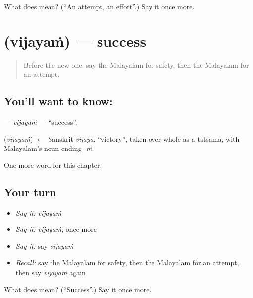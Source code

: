 \begin{tcolorbox}[breakable,colback=teal!4,colframe=teal!35!black,title={Before you move on}]
What does  mean? (\textquotedblleft{}An attempt, an effort\textquotedblright{}.) Say it once more.
\end{tcolorbox}
\section[\texorpdfstring{\ml{വിജയം} (vijayaṁ)}{വിജയം (vijayaṁ)}]{ (vijayaṁ) — success}

\label{lesson:ML-C282-vijayam}



\begin{quote}
Before the new one: say the Malayalam for safety, then the Malayalam for an attempt.
\end{quote}

\subsection*{You'll want to know: }
\textbf{} — \emph{vijayaṁ} — \textquotedblleft{}success\textquotedblright{}.

\begin{cousinweb}
\textbf{} (\emph{vijayaṁ}) $\leftarrow$ Sanskrit \emph{vijaya}, \textquotedblleft{}victory\textquotedblright{}, taken over whole as a tatsama, with Malayalam's noun ending \emph{-ṁ}.
\end{cousinweb}

\begin{grammarlens}[title={What you've built}]
One more word for this chapter.
\end{grammarlens}

\subsection*{Your turn}
\begin{itemize}
\raggedright
  \item \emph{Say it:} \emph{vijayaṁ}
  \item \emph{Say it:} \emph{vijayaṁ}, once more
  \item \emph{Say it:} say \emph{vijayaṁ}
  \item \emph{Recall:} say the Malayalam for safety, then the Malayalam for an attempt, then say \emph{vijayaṁ} again
\end{itemize}

\begin{tcolorbox}[breakable,colback=teal!4,colframe=teal!35!black,title={Before you move on}]
What does  mean? (\textquotedblleft{}Success\textquotedblright{}.) Say it once more.
\end{tcolorbox}
